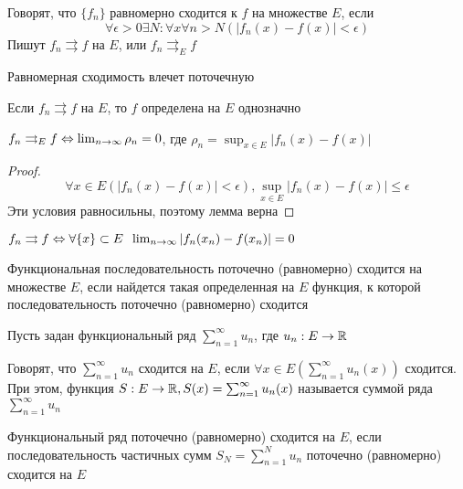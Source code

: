 \begin{definition}
  Говорят, что \(\{f_n\}\) равномерно сходится к \(f\) на множестве \(E\), если 
  \[\forall \epsilon > 0 \exists N: \forall x \forall n > N (|f_n(x) - f(x)| < \epsilon)\]
  Пишут \(f_n \rightrightarrows f\) на \(E\), или \(f_n \rightrightarrows_E f\)
\end{definition}
\begin{note}
  Равномерная сходимость влечет поточечную
\end{note}
\begin{note}
  Если \(f_n \rightrightarrows f\) на \(E\), то \(f\) определена на \(E\) однозначно
\end{note}

\begin{lemma}
  \(f_n \rightrightarrows_E f \Leftrightarrow \lim_{n \rightarrow \infty}\rho_n = 0\), где \(\rho_n = \sup_{x \in E}|f_n(x) - f(x)|\)  
\end{lemma}
\begin{proof}
  \[\forall x \in E (|f_n(x) - f(x)| < \epsilon), \sup_{x \in E}|f_n(x) - f(x)| \le \epsilon\]
  Эти условия равносильны, поэтому лемма верна
\end{proof}

\begin{problem}
  \(f_n \rightrightarrows f \Leftrightarrow \forall \{x\} \subset E\;\; \lim_{n \rightarrow \infty} |f_n(x_n) - f(x_n)| = 0\)
\end{problem}

\begin{definition}
  Функциональная последовательность поточечно (равномерно) сходится на множестве \(E\), если найдется такая определенная на \(E\) функция, к которой последовательность поточечно (равномерно) сходится
\end{definition}

Пусть задан функциональный ряд \(\sum_{n = 1}^\infty u_n\), где \(u_n: E \rightarrow \mathbb{R}\)
\begin{definition}
  Говорят, что \(\sum_{n = 1}^\infty u_n\) сходится на \(E\), если \(\forall x \in E \left(\sum_{n = 1}^\infty u_n(x)\right)\) сходится. При этом, функция \(S: E \rightarrow \mathbb{R}, S(x) = \sum_{n = 1}^\infty u_n(x)\) называется суммой ряда \(\sum_{n = 1}^\infty u_n\)
\end{definition}

\begin{definition}
  Функциональный ряд поточечно (равномерно) сходится на \(E\), если последовательность частичных сумм \(S_N = \sum_{n = 1}^N u_n\) поточечно (равномерно) сходится на \(E\)
\end{definition}

